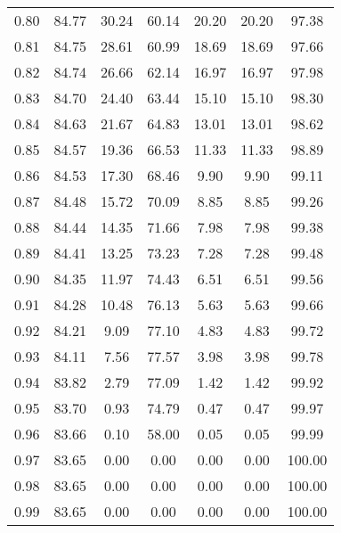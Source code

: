 \begin{tabular}{|c|c|c|c|c|c|c|}
      0.80 &     84.77 &     30.24 &      60.14 &   20.20 &      20.20 &         97.38 \\
      0.81 &     84.75 &     28.61 &      60.99 &   18.69 &      18.69 &         97.66 \\
      0.82 &     84.74 &     26.66 &      62.14 &   16.97 &      16.97 &         97.98 \\
      0.83 &     84.70 &     24.40 &      63.44 &   15.10 &      15.10 &         98.30 \\
      0.84 &     84.63 &     21.67 &      64.83 &   13.01 &      13.01 &         98.62 \\
      0.85 &     84.57 &     19.36 &      66.53 &   11.33 &      11.33 &         98.89 \\
      0.86 &     84.53 &     17.30 &      68.46 &    9.90 &       9.90 &         99.11 \\
      0.87 &     84.48 &     15.72 &      70.09 &    8.85 &       8.85 &         99.26 \\
      0.88 &     84.44 &     14.35 &      71.66 &    7.98 &       7.98 &         99.38 \\
      0.89 &     84.41 &     13.25 &      73.23 &    7.28 &       7.28 &         99.48 \\
      0.90 &     84.35 &     11.97 &      74.43 &    6.51 &       6.51 &         99.56 \\
      0.91 &     84.28 &     10.48 &      76.13 &    5.63 &       5.63 &         99.66 \\
      0.92 &     84.21 &      9.09 &      77.10 &    4.83 &       4.83 &         99.72 \\
      0.93 &     84.11 &      7.56 &      77.57 &    3.98 &       3.98 &         99.78 \\
      0.94 &     83.82 &      2.79 &      77.09 &    1.42 &       1.42 &         99.92 \\
      0.95 &     83.70 &      0.93 &      74.79 &    0.47 &       0.47 &         99.97 \\
      0.96 &     83.66 &      0.10 &      58.00 &    0.05 &       0.05 &         99.99 \\
      0.97 &     83.65 &      0.00 &       0.00 &    0.00 &       0.00 &        100.00 \\
      0.98 &     83.65 &      0.00 &       0.00 &    0.00 &       0.00 &        100.00 \\
      0.99 &     83.65 &      0.00 &       0.00 &    0.00 &       0.00 &        100.00 \\
\bottomrule
\end{tabular}
